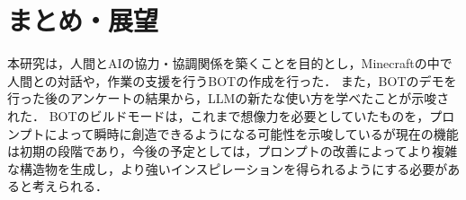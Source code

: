 \chapter{まとめ・展望}	%
\thispagestyle{plain}   %

本研究は，人間とAIの協力・協調関係を築くことを目的とし，Minecraftの中で人間との対話や，作業の支援を行うBOTの作成を行った．
また，BOTのデモを行った後のアンケートの結果から，LLMの新たな使い方を学べたことが示唆された．
BOTのビルドモードは，これまで想像力を必要としていたものを，プロンプトによって瞬時に創造できるようになる可能性を示唆しているが現在の機能は初期の段階であり，今後の予定としては，プロンプトの改善によってより複雑な構造物を生成し，より強いインスピレーションを得られるようにする必要があると考えられる．